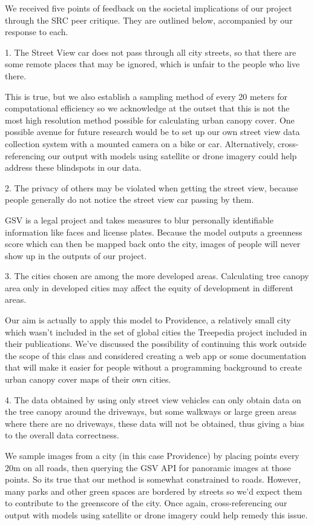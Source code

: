 We received five points of feedback on the societal implications of our project through the SRC peer critique. They are outlined below, accompanied by our response to each.

1. The Street View car does not pass through all city streets, so that there are some
remote places that may be ignored, which is unfair to the people who live there.

This is true, but we also establish a sampling method of every 20 meters for computational efficiency so we acknowledge at the outset that this is not the most high resolution method possible for calculating urban canopy cover. One possible avenue for future research would be to set up our own street view data collection system with a mounted camera on a bike or car. Alternatively, cross-referencing our output with models using satellite or drone imagery could help address these blindspots in our data.

2. The privacy of others may be violated when getting the street view, because people
generally do not notice the street view car passing by them.

GSV is a legal project and takes measures to blur personally identifiable information like faces and license plates. Because the model outputs a greenness score which can then be mapped back onto the city, images of people will never show up in the outputs of our project. 

3. The cities chosen are among the more developed areas. Calculating tree canopy
area only in developed cities may affect the equity of development in different
areas.

Our aim is actually to apply this model to Providence, a relatively small city which wasn’t included in the set of global cities the Treepedia project included in their publications. We’ve discussed the possibility of continuing this work outside the scope of this class and considered creating a web app or some documentation that will make it easier for people without a programming background to create urban canopy cover maps of their own cities.

4. The data obtained by using only street view vehicles can only obtain data on the
tree canopy around the driveways, but some walkways or large green areas where
there are no driveways, these data will not be obtained, thus giving a bias to the
overall data correctness.

We sample images from a city (in this case Providence) by placing points every 20m on all roads, then querying the GSV API for panoramic images at those points. So its true that our method is somewhat constrained to roads. However, many parks and other green spaces are bordered by streets so we’d expect them to contribute to the greenscore of the city. Once again, cross-referencing our output with models using satellite or drone imagery could help remedy this issue.

